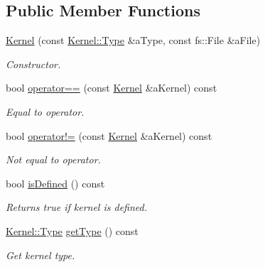 \subsection*{Public Member Functions}
\begin{DoxyCompactItemize}
\item 
\hyperlink{classlibrary_1_1physics_1_1env_1_1ephem_1_1spice_1_1_kernel_aab98b0a5581a00b222bf9b0110ecae2f}{Kernel} (const \hyperlink{classlibrary_1_1physics_1_1env_1_1ephem_1_1spice_1_1_kernel_ab28fd08b98057f635ee6a0e75b59fae6}{Kernel\+::\+Type} \&a\+Type, const fs\+::\+File \&a\+File)
\begin{DoxyCompactList}\small\item\em Constructor. \end{DoxyCompactList}\item 
bool \hyperlink{classlibrary_1_1physics_1_1env_1_1ephem_1_1spice_1_1_kernel_a2d491adecb69e25360b4ad2231f10c76}{operator==} (const \hyperlink{classlibrary_1_1physics_1_1env_1_1ephem_1_1spice_1_1_kernel}{Kernel} \&a\+Kernel) const
\begin{DoxyCompactList}\small\item\em Equal to operator. \end{DoxyCompactList}\item 
bool \hyperlink{classlibrary_1_1physics_1_1env_1_1ephem_1_1spice_1_1_kernel_a33249e0585360e78e1900089a1f26b6a}{operator!=} (const \hyperlink{classlibrary_1_1physics_1_1env_1_1ephem_1_1spice_1_1_kernel}{Kernel} \&a\+Kernel) const
\begin{DoxyCompactList}\small\item\em Not equal to operator. \end{DoxyCompactList}\item 
bool \hyperlink{classlibrary_1_1physics_1_1env_1_1ephem_1_1spice_1_1_kernel_a558c4d3b2fd3bf007fa17dd16a4deee3}{is\+Defined} () const
\begin{DoxyCompactList}\small\item\em Returns true if kernel is defined. \end{DoxyCompactList}\item 
\hyperlink{classlibrary_1_1physics_1_1env_1_1ephem_1_1spice_1_1_kernel_ab28fd08b98057f635ee6a0e75b59fae6}{Kernel\+::\+Type} \hyperlink{classlibrary_1_1physics_1_1env_1_1ephem_1_1spice_1_1_kernel_afd9f97cd229887921df198a90c23b1be}{get\+Type} () const
\begin{DoxyCompactList}\small\item\em Get kernel type. \end{DoxyCompactList}\item 

\end{DoxyCompactItemize}

